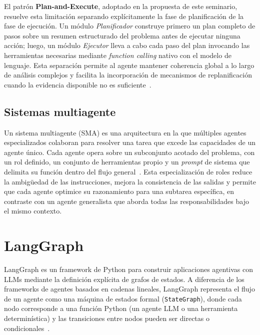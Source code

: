 El patrón \textbf{Plan-and-Execute}, adoptado en la propuesta de
este seminario, resuelve esta limitación separando explícitamente la
fase de planificación de la fase de ejecución. Un módulo
\textit{Planificador} construye primero un plan completo de pasos
sobre un resumen estructurado del problema antes de ejecutar ninguna
acción; luego, un módulo \textit{Ejecutor} lleva a cabo cada paso
del plan invocando las herramientas necesarias mediante
\textit{function calling} nativo con el modelo de lenguaje. Esta
separación permite al agente mantener coherencia global a lo largo
de análisis complejos y facilita la incorporación de mecanismos de
replanificación cuando la evidencia disponible no es
suficiente~\cite{lee2025logrespagent}.

\subsection{Sistemas multiagente}

Un sistema multiagente (SMA) es una arquitectura en la que múltiples
agentes especializados colaboran para resolver una tarea que excede
las capacidades de un agente único. Cada agente opera sobre un
subconjunto acotado del problema, con un rol definido, un conjunto
de herramientas propio y un \textit{prompt} de sistema que delimita
su función dentro del flujo general~\cite{hmimou2025multiagent}.
Esta especialización de roles reduce la ambigüedad de las
instrucciones, mejora la consistencia de las salidas y permite
que cada agente optimice su razonamiento para una subtarea
específica, en contraste con un agente generalista que aborda
todas las responsabilidades bajo el mismo contexto.

 
\section{LangGraph}
 
LangGraph es un framework de Python para construir aplicaciones
agentivas con LLMs mediante la definición explícita de grafos de
estados. A diferencia de los frameworks de agentes basados en
cadenas lineales, LangGraph representa el flujo de un agente como
una máquina de estados formal (\texttt{StateGraph}), donde cada
nodo corresponde a una función Python (un agente LLM o una
herramienta determinística) y las transiciones entre nodos pueden
ser directas o condicionales~\cite{blefari2026cyberrag}.
 
